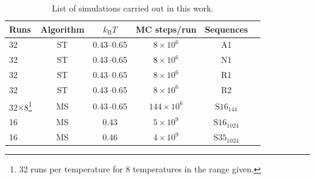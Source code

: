 \documentclass[%
 aip,
rsi,%
 amsmath,amssymb,
 reprint,%
]{revtex4-1}
\newcommand	 {\kb}		{{k_\mathrm{B}}}
\begin{document}
\begin{table}
\caption{\label{tab2} List of simulations carried out in this work. }
\begin{ruledtabular}
\begin{tabular}{lccccr}
Runs & Algorithm & $\kb T$  & MC steps/run &  Sequences\\
\hline
32 & ST & 0.43--0.65 & $8\times 10^6$ &A1\\ 
32 & ST & 0.43--0.65 & $8\times 10^6$ &N1\\ 
32 & ST & 0.43--0.65 & $8\times 10^6$ &R1\\ 
32 & ST & 0.43--0.65 & $8\times 10^6$ &R2\\ 
32$\times$8\footnote{32  runs per temperature for 8 temperatures in the range given.} & MS &0.43--0.65& $144\times 10^6$ & $\mathrm{S16}_{144}$\\
16 & MS & 0.43  & $5\times 10^9$ &  $\mathrm{S16}_{1024}$ \\
16 & MS & 0.46 & $4\times 10^9$ &  $\mathrm{S35}_{1024}$ \\
\end{tabular}
\end{ruledtabular}
\end{table}
\end{document}

